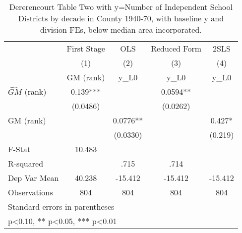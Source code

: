\begin{table}[htbp]\centering
\def\sym#1{\ifmmode^{#1}\else\(^{#1}\)\fi}
\caption{Dererencourt Table Two with y=Number of Independent School Districts by decade in County 1940-70, with baseline y and division FEs, below median area incorporated.}
\begin{tabular}{l*{4}{c}}
\toprule
                    & First Stage   &         OLS   &Reduced Form   &        2SLS   \\
                    &\multicolumn{1}{c}{(1)}&\multicolumn{1}{c}{(2)}&\multicolumn{1}{c}{(3)}&\multicolumn{1}{c}{(4)}\\
                    &\multicolumn{1}{c}{GM  (rank)}&\multicolumn{1}{c}{y\_L0}&\multicolumn{1}{c}{y\_L0}&\multicolumn{1}{c}{y\_L0}\\
\midrule
$\hat{GM}$ (rank)   &       0.139***&               &      0.0594** &               \\
                    &    (0.0486)   &               &    (0.0262)   &               \\
\addlinespace
GM  (rank)          &               &      0.0776** &               &       0.427*  \\
                    &               &    (0.0330)   &               &     (0.219)   \\
\midrule
F-Stat              &      10.483   &               &               &               \\
R-squared           &               &        .715   &        .714   &               \\
Dep Var Mean        &      40.238   &     -15.412   &     -15.412   &     -15.412   \\
Observations        &         804   &         804   &         804   &         804   \\
\bottomrule
\multicolumn{5}{l}{\footnotesize Standard errors in parentheses}\\
\multicolumn{5}{l}{\footnotesize * p<0.10, ** p<0.05, *** p<0.01}\\
\end{tabular}
\end{table}
